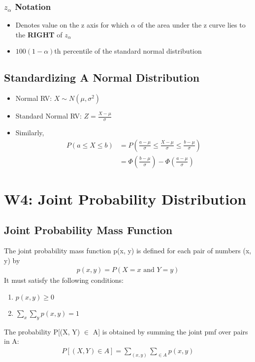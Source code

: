 \documentclass[a4paper]{article}
\begin{document}
\subsubsection{\texorpdfstring{$z_{\alpha}$}{za} Notation}
\begin{itemize}
    \item Denotes value on the z axis for which $\alpha$ of the area under the z curve lies to the \textbf{RIGHT} of $z_{\alpha}$
    \item $100(1-\alpha)$th percentile of the standard normal distribution
\end{itemize}
\subsection{Standardizing A Normal Distribution}
\begin{itemize}
    \item Normal RV: $X \sim N(\mu, \sigma^{2})$
    \item Standard Normal RV: $Z = \displaystyle\frac{X-\mu}{\sigma}$ 
    \item Similarly,
    \begin{align*}
        P(a \leq X \leq b) &= P\left(\frac{a-\mu}{\sigma}\leq \frac{X-\mu}{\sigma} \leq \frac{b-\mu}{\sigma}\right)\\
        &= \Phi\left(\frac{b-\mu}{\sigma}\right)-\Phi\left(\frac{a-\mu}{\sigma}\right)
    \end{align*}
\end{itemize}
\newpage
\section{W4: Joint Probability Distribution}
\subsection{Joint Probability Mass Function}
The joint probability mass function p(x, y) is defined for each pair of numbers (x, y) by
\begin{align*}
    p(x, y) = P(X = x\text{ and }Y = y)
\end{align*}
It must satisfy the following conditions:
\begin{enumerate}
    \item $p(x, y) \geq 0$
    \item $\sum\limits_{x}\sum\limits_{y}p(x, y) = 1$
\end{enumerate}
The probability P[(X, Y) $\in$ A] is obtained by summing the joint pmf over pairs in A:
\begin{align*}
    P[(X, Y)\in A] = \sum\limits_{(x, y)}\sum\limits_{\in A}p(x, y)
\end{align*}
\end{document}

